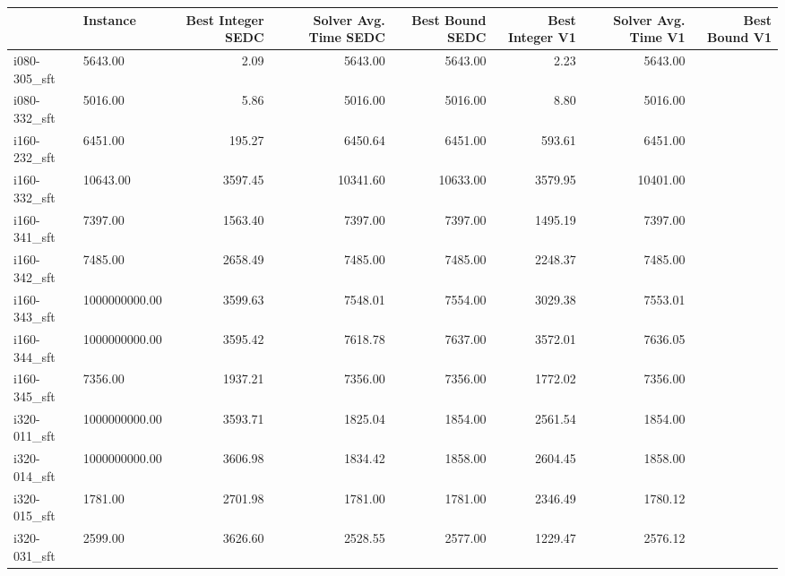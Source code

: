 \begin{tabular}{llrrrrrr}
\toprule
{} &      Instance &  Best Integer SEDC &  Solver Avg. Time SEDC &  Best Bound SEDC &  Best Integer V1 &  Solver Avg. Time V1 &  Best Bound V1 \\
\midrule
i080-305\_sft &            5643.00 &                   2.09 &          5643.00 &          5643.00 &                 2.23 &        5643.00 \\
i080-332\_sft &            5016.00 &                   5.86 &          5016.00 &          5016.00 &                 8.80 &        5016.00 \\
i160-232\_sft &            6451.00 &                 195.27 &          6450.64 &          6451.00 &               593.61 &        6451.00 \\
i160-332\_sft &           10643.00 &                3597.45 &         10341.60 &         10633.00 &              3579.95 &       10401.00 \\
i160-341\_sft &            7397.00 &                1563.40 &          7397.00 &          7397.00 &              1495.19 &        7397.00 \\
i160-342\_sft &            7485.00 &                2658.49 &          7485.00 &          7485.00 &              2248.37 &        7485.00 \\
i160-343\_sft &      1000000000.00 &                3599.63 &          7548.01 &          7554.00 &              3029.38 &        7553.01 \\
i160-344\_sft &      1000000000.00 &                3595.42 &          7618.78 &          7637.00 &              3572.01 &        7636.05 \\
i160-345\_sft &            7356.00 &                1937.21 &          7356.00 &          7356.00 &              1772.02 &        7356.00 \\
i320-011\_sft &      1000000000.00 &                3593.71 &          1825.04 &          1854.00 &              2561.54 &        1854.00 \\
i320-014\_sft &      1000000000.00 &                3606.98 &          1834.42 &          1858.00 &              2604.45 &        1858.00 \\
i320-015\_sft &            1781.00 &                2701.98 &          1781.00 &          1781.00 &              2346.49 &        1780.12 \\
i320-031\_sft &            2599.00 &                3626.60 &          2528.55 &          2577.00 &              1229.47 &        2576.12 \\

\end{tabular}
